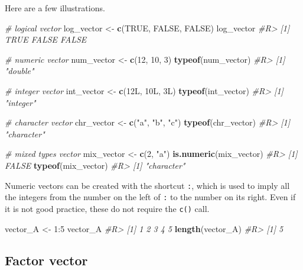 \documentclass[]{book}
\newenvironment{Shaded}{}{}
\newcommand{\CommentTok}[1]{\textcolor[rgb]{0.38,0.63,0.69}{\textit{#1}}}
\newcommand{\DecValTok}[1]{\textcolor[rgb]{0.25,0.63,0.44}{#1}}
\newcommand{\KeywordTok}[1]{\textcolor[rgb]{0.00,0.44,0.13}{\textbf{#1}}}
\newcommand{\NormalTok}[1]{#1}
\newcommand{\OperatorTok}[1]{\textcolor[rgb]{0.40,0.40,0.40}{#1}}
\newcommand{\OtherTok}[1]{\textcolor[rgb]{0.00,0.44,0.13}{#1}}
\newcommand{\StringTok}[1]{\textcolor[rgb]{0.25,0.44,0.63}{#1}}
\theoremstyle{definition}
\theoremstyle{definition}
\theoremstyle{definition}
\theoremstyle{remark}
\begin{document}
Here are a few illustrations.

\begin{Shaded}
\begin{Highlighting}[]
\CommentTok{# logical vector}
\NormalTok{log_vector <-}\StringTok{ }\KeywordTok{c}\NormalTok{(}\OtherTok{TRUE}\NormalTok{, }\OtherTok{FALSE}\NormalTok{, }\OtherTok{FALSE}\NormalTok{)}
\NormalTok{log_vector}
\CommentTok{#R> [1]  TRUE FALSE FALSE}

\CommentTok{# numeric vector}
\NormalTok{num_vector <-}\StringTok{ }\KeywordTok{c}\NormalTok{(}\DecValTok{12}\NormalTok{, }\DecValTok{10}\NormalTok{, }\DecValTok{3}\NormalTok{)}
\KeywordTok{typeof}\NormalTok{(num_vector)}
\CommentTok{#R> [1] "double"}

\CommentTok{# integer vector}
\NormalTok{int_vector <-}\StringTok{ }\KeywordTok{c}\NormalTok{(12L, 10L, 3L)}
\KeywordTok{typeof}\NormalTok{(int_vector)}
\CommentTok{#R> [1] "integer"}


\CommentTok{# character vector}
\NormalTok{chr_vector <-}\StringTok{ }\KeywordTok{c}\NormalTok{(}\StringTok{"a"}\NormalTok{, }\StringTok{"b"}\NormalTok{, }\StringTok{"c"}\NormalTok{)}
\KeywordTok{typeof}\NormalTok{(chr_vector)}
\CommentTok{#R> [1] "character"}

\CommentTok{# mixed types vector}
\NormalTok{mix_vector <-}\StringTok{ }\KeywordTok{c}\NormalTok{(}\DecValTok{2}\NormalTok{, }\StringTok{"a"}\NormalTok{)}
\KeywordTok{is.numeric}\NormalTok{(mix_vector)}
\CommentTok{#R> [1] FALSE}
\KeywordTok{typeof}\NormalTok{(mix_vector)}
\CommentTok{#R> [1] "character"}
\end{Highlighting}
\end{Shaded}

Numeric vectors can be created with the shortcut \texttt{:}, which is
used to imply all the integers from the number on the left of \texttt{:}
to the number on its right. Even if it is not good practice, these do
not require the \texttt{c()} call.

\begin{Shaded}
\begin{Highlighting}[]
\NormalTok{vector_A <-}\StringTok{ }\DecValTok{1}\OperatorTok{:}\DecValTok{5}
\NormalTok{vector_A}
\CommentTok{#R> [1] 1 2 3 4 5}
\KeywordTok{length}\NormalTok{(vector_A)}
\CommentTok{#R> [1] 5}
\end{Highlighting}
\end{Shaded}

\hypertarget{factor-vector}{%
\subsection{Factor vector}\label{factor-vector}}
\end{document}
